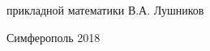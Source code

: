 \begin{titlepage}
    прикладной математики  \hspace*{5cm} В.А. Лушников
    
    
    
    
    \vspace{\fill}

    \begin{center}
    Симферополь 2018
    \end{center}

    \end{titlepage}
